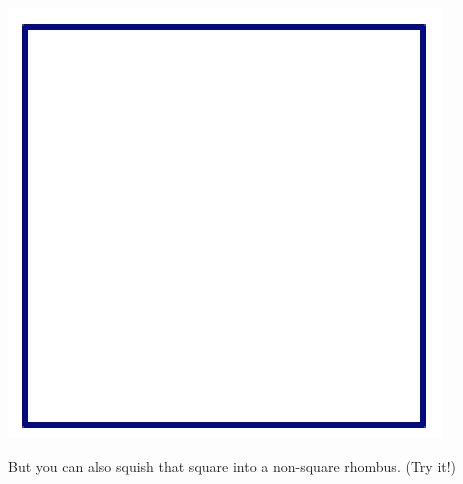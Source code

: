 \begin{center}
\includegraphics[scale = .45]{square2}
\end{center}
But you can also squish that square into a non-square rhombus.  (Try it!)

